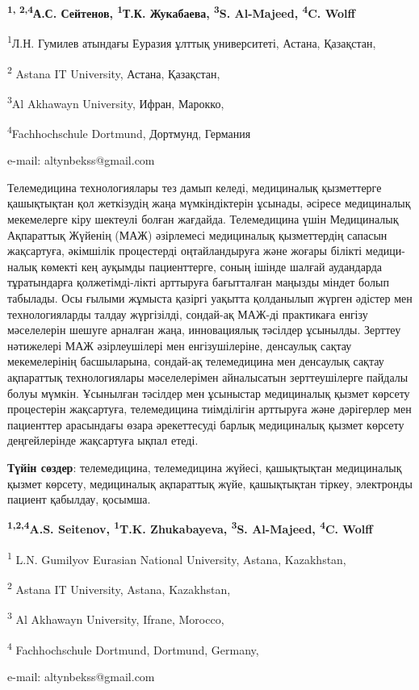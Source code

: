 \begin{center}
{\bfseries \textsuperscript{1, 2,4}А.С. Сейтенов\envelope,
\textsuperscript{1}Т.К. Жукабаева, \textsuperscript{3}S. Al-Majeed,
\textsuperscript{4}C. Wolff}

\textsuperscript{1}Л.Н. Гумилев атындағы Еуразия ұлттық университеті,
Астана, Қазақстан,

\textsuperscript{2} Astana IT University, Астана, Қазақстан,

\textsuperscript{3}Al Akhawayn University, Ифран, Марокко,

\textsuperscript{4}Fachhochschule Dortmund, Дортмунд, Германия

e-mail: altynbekss@gmail.com
\end{center}

Телемедицина технологиялары тез дамып келеді, медициналық қызметтерге
қашықтықтан қол жеткізудің жаңа мүмкіндіктерін ұсынады, әсіресе
медициналық мекемелерге кіру шектеулі болған жағдайда. Телемедицина үшін
Медициналық Ақпараттық Жүйенің (МАЖ) әзірлемесі медициналық қызметтердің
сапасын жақсартуға, әкімшілік процестерді оңтайландыруға және жоғары
білікті медици-налық көмекті кең ауқымды пациенттерге, соның ішінде
шалғай аудандарда тұратындарға қолжетімді-лікті арттыруға бағытталған
маңызды міндет болып табылады. Осы ғылыми жұмыста қазіргі уақытта
қолданылып жүрген әдістер мен технологияларды талдау жүргізілді,
сондай-ақ МАЖ-ді практикаға енгізу мәселелерін шешуге арналған жаңа,
инновациялық тәсілдер ұсынылды. Зерттеу нәтижелері МАЖ әзірлеушілері мен
енгізушілеріне, денсаулық сақтау мекемелерінің басшыларына, сондай-ақ
телемедицина мен денсаулық сақтау ақпараттық технологиялары
мәселелерімен айналысатын зерттеушілерге пайдалы болуы мүмкін. Ұсынылған
тәсілдер мен ұсыныстар медициналық қызмет көрсету процестерін
жақсартуға, телемедицина тиімділігін арттыруға және дәрігерлер мен
пациенттер арасындағы өзара әрекеттесуді барлық медициналық қызмет
көрсету деңгейлерінде жақсартуға ықпал етеді.

{\bfseries Түйін сөздер}: телемедицина, телемедицина жүйесі, қашықтықтан
медициналық қызмет көрсету, медициналық ақпараттық жүйе, қашықтықтан
тіркеу, электронды пациент қабылдау, қосымша.


\begin{center}
{\bfseries \textsuperscript{1,2,4}A.S. Seitenov\envelope,
\textsuperscript{1}T.K. Zhukabayeva, \textsuperscript{3}S. Al-Majeed,
\textsuperscript{4}C. Wolff}

\textsuperscript{1} L.N. Gumilyov Eurasian National University, Astana,
Kazakhstan,

\textsuperscript{2} Astana IT University, Astana, Kazakhstan,

\textsuperscript{3} Al Akhawayn University, Ifrane, Morocco,

\textsuperscript{4} Fachhochschule Dortmund, Dortmund, Germany,

e-mail: altynbekss@gmail.com
\end{center}

